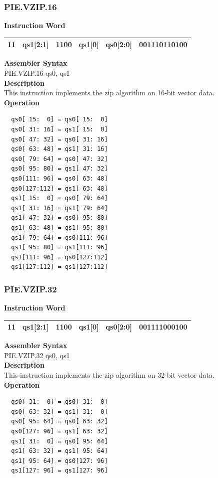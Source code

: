 \newpage
\subsubsection{PIE.VZIP.16}\label{instruction:PIEVZIP16}
\setlength\tabcolsep{6pt}
\textbf{Instruction Word} \\
\begin{tabular}{|c|c|c|c|c|c|}
	\hline
	11 & qs1[2:1] & 1100 & qs1[0] & qs0[2:0] & 001110110100 \\
	\hline
\end{tabular}

\textbf{Assembler Syntax} \\
PIE.VZIP.16 qs0, qs1 \\
\textbf{Description} \\
This instruction implements the zip algorithm on 16-bit vector data.\\
\textbf{Operation}
\begin{lstlisting}
  qs0[ 15:  0] = qs0[ 15:  0]
  qs0[ 31: 16] = qs1[ 15:  0]
  qs0[ 47: 32] = qs0[ 31: 16]
  qs0[ 63: 48] = qs1[ 31: 16]
  qs0[ 79: 64] = qs0[ 47: 32]
  qs0[ 95: 80] = qs1[ 47: 32]
  qs0[111: 96] = qs0[ 63: 48]
  qs0[127:112] = qs1[ 63: 48]
  qs1[ 15:  0] = qs0[ 79: 64]
  qs1[ 31: 16] = qs1[ 79: 64]
  qs1[ 47: 32] = qs0[ 95: 80]
  qs1[ 63: 48] = qs1[ 95: 80]
  qs1[ 79: 64] = qs0[111: 96]
  qs1[ 95: 80] = qs1[111: 96]
  qs1[111: 96] = qs0[127:112]
  qs1[127:112] = qs1[127:112]
\end{lstlisting}

\newpage
\subsubsection{PIE.VZIP.32}\label{instruction:PIEVZIP32}
\setlength\tabcolsep{6pt}
\textbf{Instruction Word} \\
\begin{tabular}{|c|c|c|c|c|c|}
	\hline
	11 & qs1[2:1] & 1100 & qs1[0] & qs0[2:0] & 001111000100 \\
	\hline
\end{tabular}

\textbf{Assembler Syntax} \\
PIE.VZIP.32 qs0, qs1 \\
\textbf{Description} \\
This instruction implements the zip algorithm on 32-bit vector data.\\
\textbf{Operation}
\begin{lstlisting}
  qs0[ 31:  0] = qs0[ 31:  0]
  qs0[ 63: 32] = qs1[ 31:  0]
  qs0[ 95: 64] = qs0[ 63: 32]
  qs0[127: 96] = qs1[ 63: 32]
  qs1[ 31:  0] = qs0[ 95: 64]
  qs1[ 63: 32] = qs1[ 95: 64]
  qs1[ 95: 64] = qs0[127: 96]
  qs1[127: 96] = qs1[127: 96]
\end{lstlisting}

